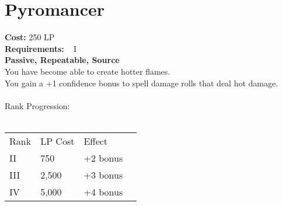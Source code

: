 \section{Pyromancer}\label{perk:pyromancer}
\textbf{Cost:} 250 LP\\
\textbf{Requirements:} ~ I\\
\textbf{Passive, Repeatable, Source}\\
You have become able to create hotter flames.\\
You gain a +1 confidence bonus to spell damage rolls that deal hot damage.\\
\\
Rank Progression:\\
\\
\begin{tabular}{l | l | l | l}
    Rank & LP Cost &  Effect\\
    II & 750 & +2 bonus\\
    III & 2,500 & +3 bonus\\
    IV & 5,000 & +4 bonus\\
\end{tabular}
